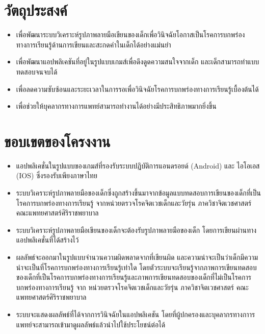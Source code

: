 \documentclass[12pt,oneside,openright,a4paper]{cpe-thai-project}
\begin{document}
\section{วัตถุประสงค์}

\begin{itemize}
  \item  เพื่อพัฒนาระบบวิเคราะห์รูปภาพลายมือเขียนของเด็กเพื่อวินิจฉัยโอกาสเป็นโรคการบกพร่องทางการเรียนรู้ด้านการเขียนและสะกดคำในเด็กได้อย่างแม่นยำ
  \item  เพื่อพัฒนาแอปพลิเคชันที่อยู่ในรูปแบบเกมส์เพื่อดึงดูดความสนใจจากเด็ก และเด็กสามารถทำแบบทดสอบจนจบได้ 
  \item  เพื่อลดความซับซ้อนและระยะเวลาในการรอเพื่อวินิจฉัยโรคการบกพร่องทางการเรียนรู้เบื้องต้นได้
  \item  เพื่อช่วยให้บุคลากรทางการแพทย์สามารถทำงานได้อย่างมีประสิทธิภาพมากยิ่งขึ้น  
  \end{itemize}

\section{ขอบเขตของโครงงาน}

\begin{itemize}
\item  แอปพลิเคชั่นในรูปแบบของเกมส์ที่รองรับระบบปฏิบัติการแอนดรอยด์ (Android)  และ ไอโอเอส (IOS) ซึ่งรองรับเพียงภาษาไทย 
\item  ระบบวิเคราะห์รูปภาพลายมือของเด็กซึ่งถูกสร้างขึ้นมาจากข้อมูลแบบทดสอบการเขียนของเด็กที่เป็นโรคการบกพร่องทางการเรียนรู้ จากหน่วยตรวจโรคจิตเวชเด็กและวัยรุ่น ภาควิชาจิตเวชศาสตร์ คณะแพทยศาสตร์ศิริราชพยาบาล
\item  ระบบวิเคราะห์รูปภาพลายมือเขียนของเด็กจะต้องรับรูปภาพลายมือของเด็ก โดยการเขียนผ่านทางแอปพลิเคชั่นที่ได้สร้างไว้
\item  ผลลัพธ์จะออกมาในรูปแบบจำนวนความผิดพลาดจากที่เขียนผิด และความน่าจะเป็นว่าเด็กมีความน่าจะเป็นที่โรคการบกพร่องทางการเรียนรู้เท่าใด โดยตัวระบบจะเรียนรู้จากภาพการเขียนทดสอบของเด็กที่เป็นโรคการบกพร่องทางการเรียนรู้และภาพการเขียนทดสอบของเด็กที่ไม่เป็นโรคการบกพร่องทางการเรียนรู้ จาก หน่วยตรวจโรคจิตเวชเด็กและวัยรุ่น ภาควิชาจิตเวชศาสตร์ คณะแพทยศาสตร์ศิริราชพยาบาล
\item  ระบบจะแสดงผลลัพธ์ที่ได้จากการวินิจฉัยในแอปพลิเคชัน โดยที่ผู้ปกครองและบุคลากรทางกาารแพทย์จะสามารถเข้ามาดูผลลัพธ์แล้วนำไปใช้ประโยชน์ต่อได้ 
\end{itemize}
\end{document}
